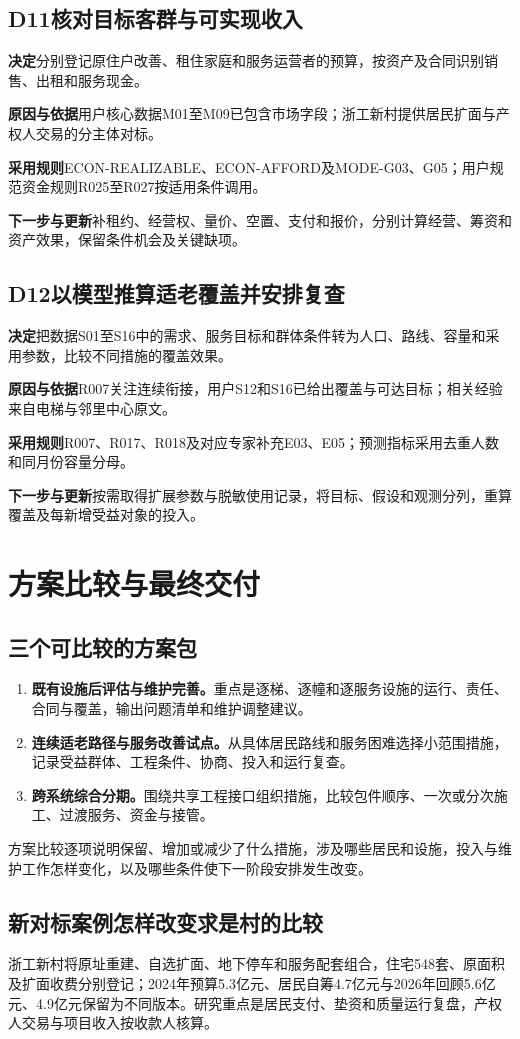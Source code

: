 \documentclass[UTF8,11pt,fontset=windows]{ctexart}
\newcommand{\field}[2]{\par\noindent\textbf{#1}\quad #2\par}
\newcommand{\decision}[2]{\Needspace{7\baselineskip}\subsection*{#1\quad #2}}
\begin{document}
\decision{D11}{核对目标客群与可实现收入}
\field{决定}{分别登记原住户改善、租住家庭和服务运营者的预算，按资产及合同识别销售、出租和服务现金。}
\field{原因与依据}{用户核心数据M01至M09已包含市场字段；浙工新村提供居民扩面与产权人交易的分主体对标。\cite{zhegongdata}}
\field{采用规则}{ECON-REALIZABLE、ECON-AFFORD及MODE-G03、G05；用户规范资金规则R025至R027按适用条件调用。}
\field{下一步与更新}{补租约、经营权、量价、空置、支付和报价，分别计算经营、筹资和资产效果，保留条件机会及关键缺项。}

\decision{D12}{以模型推算适老覆盖并安排复查}
\field{决定}{把数据S01至S16中的需求、服务目标和群体条件转为人口、路线、容量和采用参数，比较不同措施的覆盖效果。}
\field{原因与依据}{R007关注连续衔接，用户S12和S16已给出覆盖与可达目标；相关经验来自电梯与邻里中心原文。\cite{trust,neighbor}}
\field{采用规则}{R007、R017、R018及对应专家补充E03、E05；预测指标采用去重人数和同月份容量分母。}
\field{下一步与更新}{按需取得扩展参数与脱敏使用记录，将目标、假设和观测分列，重算覆盖及每新增受益对象的投入。}

\section{方案比较与最终交付}

\subsection{三个可比较的方案包}

\begin{enumerate}
\item \textbf{既有设施后评估与维护完善。}重点是逐梯、逐幢和逐服务设施的运行、责任、合同与覆盖，输出问题清单和维护调整建议。
\item \textbf{连续适老路径与服务改善试点。}从具体居民路线和服务困难选择小范围措施，记录受益群体、工程条件、协商、投入和运行复查。
\item \textbf{跨系统综合分期。}围绕共享工程接口组织措施，比较包件顺序、一次或分次施工、过渡服务、资金与接管。
\end{enumerate}

方案比较逐项说明保留、增加或减少了什么措施，涉及哪些居民和设施，投入与维护工作怎样变化，以及哪些条件使下一阶段安排发生改变。

\subsection{新对标案例怎样改变求是村的比较}

浙工新村将原址重建、自选扩面、地下停车和服务配套组合，住宅548套、原面积及扩面收费分别登记；2024年预算5.3亿元、居民自筹4.7亿元与2026年回顾5.6亿元、4.9亿元保留为不同版本。研究重点是居民支付、垫资和质量运行复盘，产权人交易与项目收入按收款人核算。\cite{zhegongdata,zhegongfollow}
\end{document}
